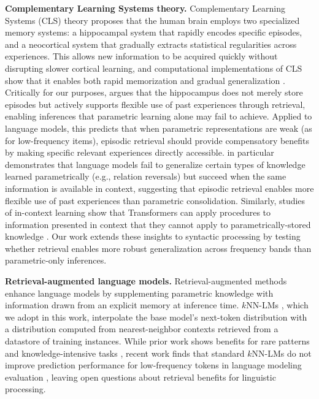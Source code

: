 \noindent \textbf{Complementary Learning Systems theory.}
Complementary Learning Systems (CLS) theory \citep{mcclelland1995there, kumaran2016learning} proposes that the human brain employs two specialized memory systems: a hippocampal system that rapidly encodes specific episodes, and a neocortical system that gradually extracts statistical regularities across experiences. This allows new information to be acquired quickly without disrupting slower cortical learning, and computational implementations of CLS show that it enables both rapid memorization and gradual generalization \citep{mcclelland1995there}. Critically for our purposes, \citet{eichenbaum2001hippocampus} argues that the hippocampus does not merely store episodes but actively supports flexible use of past experiences through retrieval, enabling inferences that parametric learning alone may fail to achieve. Applied to language models, this predicts that when parametric representations are weak (as for low-frequency items), episodic retrieval should provide compensatory benefits by making specific relevant experiences directly accessible.  \citet{lampinen2025latent} in particular demonstrates that language models fail to generalize certain types of knowledge learned parametrically (e.g., relation reversals) but succeed when the same information is available in context, suggesting that episodic retrieval enables more flexible use of past experiences than parametric consolidation. Similarly, studies of in-context learning show that Transformers can apply procedures to information presented in context that they cannot apply to parametrically-stored knowledge \citep{chan2022transformers}. Our work extends these insights to syntactic processing by testing whether retrieval enables more robust generalization across frequency bands than parametric-only inferences.

\noindent \textbf{Retrieval-augmented language models.}  
Retrieval-augmented methods enhance language models by supplementing parametric knowledge with information drawn from an explicit memory at inference time. $k$NN-LMs \citep{khandelwal2020knnlm}, which we adopt in this work, interpolate the base model's next-token distribution with a distribution computed from nearest-neighbor contexts retrieved from a datastore of training instances. While prior work shows benefits for rare patterns and knowledge-intensive tasks \citep{borgeaud2022improving,kandpal2023large,mallen2023trust}, recent work finds that standard $k$NN-LMs do not improve prediction performance for low-frequency tokens in language modeling evaluation \citep{nishida2025long}, leaving open questions about retrieval benefits for linguistic processing.




